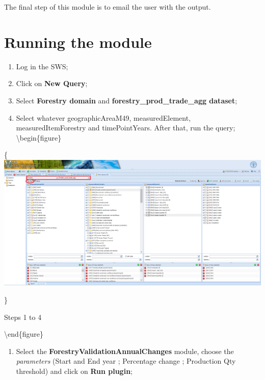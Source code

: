 \documentclass[
]{book}
\providecommand{\tightlist}{%
  \setlength{\itemsep}{0pt}\setlength{\parskip}{0pt}}
\begin{document}
The final step of this module is to email the user with the output.

\hypertarget{running-the-module-4}{%
\section{\texorpdfstring{\textbf{Running the module}}{Running the module}}\label{running-the-module-4}}

\begin{enumerate}
\def\labelenumi{\arabic{enumi}.}
\item
  Log in the SWS;
\item
  Click on \textbf{New Query};
\item
  Select \textbf{Forestry domain} and \textbf{forestry\_prod\_trade\_agg dataset};
\item
  Select whatever geographicAreaM49, measuredElement, measuredItemForestry and timePointYears. After that, run the query;
  \textbackslash begin\{figure\}
\end{enumerate}

\{\centering \includegraphics[width=1\linewidth]{images/forestry_prod_trade_agg_query}

\}

\caption{Steps 1 to 4}

\label{fig:queryAnnualChanges}
\textbackslash end\{figure\}

\begin{enumerate}
\def\labelenumi{\arabic{enumi}.}
\setcounter{enumi}{4}
\tightlist
\item
  Select the \textbf{ForestryValidationAnnualChanges} module, choose the \emph{parameters} (Start and End year ; Percentage change ; Production Qty threshold) and click on \textbf{Run plugin};
\end{enumerate}
\end{document}
